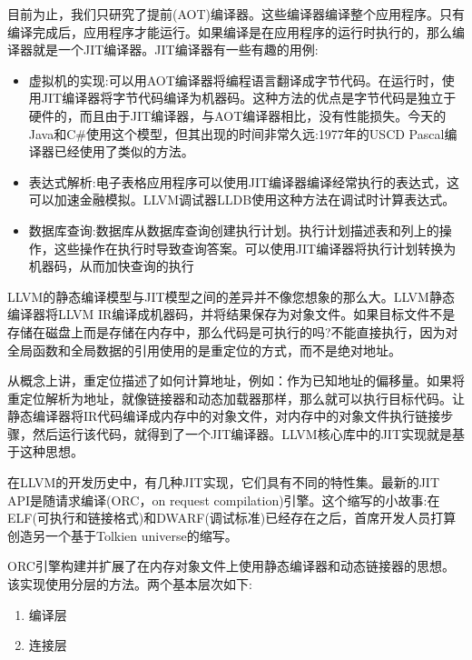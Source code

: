 目前为止，我们只研究了提前(AOT)编译器。这些编译器编译整个应用程序。只有编译完成后，应用程序才能运行。如果编译是在应用程序的运行时执行的，那么编译器就是一个JIT编译器。JIT编译器有一些有趣的用例:\par

\begin{itemize}
\item 虚拟机的实现:可以用AOT编译器将编程语言翻译成字节代码。在运行时，使用JIT编译器将字节代码编译为机器码。这种方法的优点是字节代码是独立于硬件的，而且由于JIT编译器，与AOT编译器相比，没有性能损失。今天的Java和C\#使用这个模型，但其出现的时间非常久远:1977年的USCD Pascal编译器已经使用了类似的方法。

\item 表达式解析:电子表格应用程序可以使用JIT编译器编译经常执行的表达式，这可以加速金融模拟。LLVM调试器LLDB使用这种方法在调试时计算表达式。

\item 数据库查询:数据库从数据库查询创建执行计划。执行计划描述表和列上的操作，这些操作在执行时导致查询答案。可以使用JIT编译器将执行计划转换为机器码，从而加快查询的执行
\end{itemize}

LLVM的静态编译模型与JIT模型之间的差异并不像您想象的那么大。LLVM静态编译器将LLVM IR编译成机器码，并将结果保存为对象文件。如果目标文件不是存储在磁盘上而是存储在内存中，那么代码是可执行的吗?不能直接执行，因为对全局函数和全局数据的引用使用的是重定位的方式，而不是绝对地址。\par

从概念上讲，重定位描述了如何计算地址，例如：作为已知地址的偏移量。如果将重定位解析为地址，就像链接器和动态加载器那样，那么就可以执行目标代码。让静态编译器将IR代码编译成内存中的对象文件，对内存中的对象文件执行链接步骤，然后运行该代码，就得到了一个JIT编译器。LLVM核心库中的JIT实现就是基于这种思想。\par

在LLVM的开发历史中，有几种JIT实现，它们具有不同的特性集。最新的JIT API是随请求编译(ORC，on request compilation)引擎。这个缩写的小故事:在ELF(可执行和链接格式)和DWARF(调试标准)已经存在之后，首席开发人员打算创造另一个基于Tolkien universe的缩写。\par

ORC引擎构建并扩展了在内存对象文件上使用静态编译器和动态链接器的思想。该实现使用分层的方法。两个基本层次如下:\par

\begin{enumerate}
\item 编译层 
\item 连接层
\end{enumerate}

